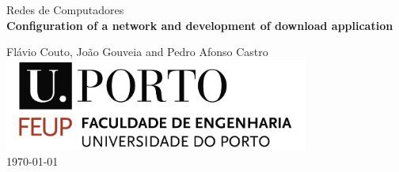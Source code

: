 \documentclass[11pt,a4paper,reqno]{article}
\numberwithin{equation}{section}
\begin{document}
\begin{titlepage}
\begin{center}
 
\vspace*{3cm}

{\Large Redes de Computadores}\\[2cm]

{\Huge \bfseries Configuration of a network and development of download application \\[1cm]}

{\large Flávio Couto, João Gouveia and Pedro Afonso Castro}\\[2cm]

\includegraphics[width=10cm]{feup_logo.jpg}\\[2cm]


{\large \today}

\end{center}
\end{titlepage}

\begin{abstract}
This report aims to explain our approach regarding the second project proposed by our teachers in the subject “Redes de Computadores”. This project was split into two parts. The development of a download application, using TCP sockets to connect to an FTP server to download the file requested by the user, and into the configuration and studying of a computer network, consisting in configuring an Internet Protocol (IP) network, implementing virtual LANs (VLANs) in a switch, configuring a router and a commercial router, implementing Network Address Translation (NAT) and configuring the Domain Name System (DNS), establishing a TCP connection (using the application developed in the first part of the project).

Our group managed to comprehend and reach all the purposed goals with success, as we will show in this report.

\end{abstract}

\tableofcontents
\newpage

\end{document}
